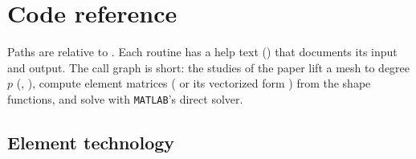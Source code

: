 \chapter{Code reference}
\label{ch:reference}

Paths are relative to . Each routine has a help text
() that documents its input and output. The call graph is short:
the studies of the paper lift a mesh to degree $p$ (,
), compute element matrices ( or its
vectorized form ) from the shape functions, and solve with
\texttt{MATLAB}'s direct solver.

\section{Element technology}

